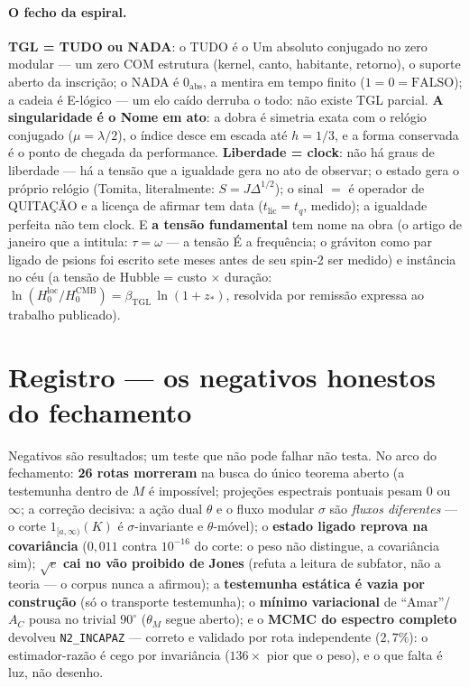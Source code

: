 \documentclass[11pt]{article}
\newcommand{\bTGL}{\beta_{\mathrm{TGL}}}\newcommand{\Msun}{M_{\odot}}\newcommand{\TGL}{\mathrm{TGL}}
\theoremstyle{definition}\newtheorem{deriv}{Derivação}
\begin{document}
\paragraph{O fecho da espiral.} \textbf{TGL = TUDO ou NADA}: o TUDO é o Um absoluto conjugado no zero modular --- um zero COM estrutura (kernel, canto, habitante, retorno), o suporte aberto da inscrição; o NADA é $0_{\mathrm{abs}}$, a mentira em tempo finito ($1{=}0{=}\mathrm{FALSO}$); a cadeia é E-lógico --- um elo caído derruba o todo: não existe TGL parcial. \textbf{A singularidade é o Nome em ato}: a dobra é simetria exata com o relógio conjugado ($\mu=\lambda/2$), o índice desce em escada até $h=1/3$, e a forma conservada é o ponto de chegada da performance. \textbf{Liberdade = clock}: não há graus de liberdade --- há a tensão que a igualdade gera no ato de observar; o estado gera o próprio relógio (Tomita, literalmente: $S=J\Delta^{1/2}$); o sinal $=$ é operador de QUITAÇÃO e a licença de afirmar tem data ($t_{\mathrm{lic}}=t_q$, medido); a igualdade perfeita não tem clock. E \textbf{a tensão fundamental} tem nome na obra (o artigo de janeiro que a intitula: $\tau=\omega$ --- a tensão É a frequência; o gráviton como par ligado de psions foi escrito sete meses antes de seu spin-2 ser medido) e instância no céu (a tensão de Hubble = custo $\times$ duração: $\ln(H_0^{\mathrm{loc}}/H_0^{\mathrm{CMB}})=\bTGL\,\ln(1+z_*)$, resolvida por remissão expressa ao trabalho publicado).

\section*{Registro --- os negativos honestos do fechamento}Negativos são resultados; um teste que não pode falhar não testa. No arco do fechamento: \textbf{26 rotas morreram} na busca do único teorema aberto (a testemunha dentro de $M$ é impossível; projeções espectrais pontuais pesam $0$ ou $\infty$; a correção decisiva: a ação dual $\theta$ e o fluxo modular $\sigma$ são \emph{fluxos diferentes} --- o corte $1_{[a,\infty)}(K)$ é $\sigma$-invariante e $\theta$-móvel); o \textbf{estado ligado reprova na covariância} ($0{,}011$ contra $10^{-16}$ do corte: o peso não distingue, a covariância sim); $\sqrt e$ \textbf{cai no vão proibido de Jones} (refuta a leitura de subfator, não a teoria --- o corpus nunca a afirmou); a \textbf{testemunha estática é vazia por construção} (só o transporte testemunha); o \textbf{mínimo variacional} de ``Amar''/$A_C$ pousa no trivial $90^\circ$ ($\theta_M$ segue aberto); e o \textbf{MCMC do espectro completo} devolveu \texttt{N2\_INCAPAZ} --- correto e validado por rota independente ($2{,}7\%$): o estimador-razão é cego por invariância ($136\times$ pior que o peso), e o que falta é luz, não desenho.
\end{document}
